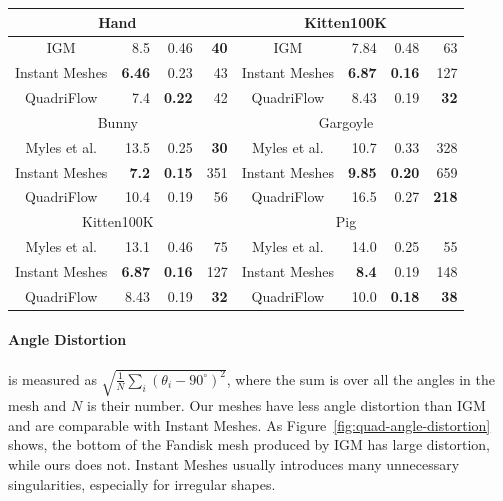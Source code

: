 \begin{table}
\begin{tabular}{|c|r|r|r|c|r|r|r|}
\hline
\multicolumn{4}{|c|}{Hand~\cite{bommes2013integer}}  & \multicolumn{4}{c|}{Kitten100K~\cite{bommes2013integer}}  \\
\hline
IGM & 8.5 & 0.46 & \textbf{40} & IGM & 7.84 & 0.48 & 63 \\
\hline
Instant Meshes & \textbf{6.46} & 0.23 & 43 & Instant Meshes & \textbf{6.87} & \textbf{0.16} & 127 \\
\hline
QuadriFlow & 7.4 & \textbf{0.22} & 42 & QuadriFlow & 8.43 & 0.19 & \textbf{32} \\
\hline
\multicolumn{4}{|c|}{Bunny~\cite{myles2014robust}} & \multicolumn{4}{c|}{Gargoyle~\cite{myles2014robust}}  \\
\hline
Myles et al. & 13.5 & 0.25 & \textbf{30} & Myles et al. & 10.7 & 0.33 & 328 \\
\hline
Instant Meshes & \textbf{7.2} & \textbf{0.15} & 351 & Instant Meshes & \textbf{9.85} & \textbf{0.20} & 659 \\
\hline
QuadriFlow & 10.4 & 0.19 & 56 & QuadriFlow & 16.5 & 0.27 & \textbf{218} \\
\hline
\multicolumn{4}{|c|}{Kitten100K~\cite{myles2014robust}}  & \multicolumn{4}{c|}{Pig~\cite{myles2014robust}}  \\
\hline
Myles et al. & 13.1 & 0.46 & 75 & Myles et al. & 14.0 & 0.25 & 55 \\
\hline
Instant Meshes & \textbf{6.87} & \textbf{0.16} & 127 & Instant Meshes & \textbf{8.4} & 0.19 & 148 \\
\hline
QuadriFlow & 8.43 & 0.19 & \textbf{32} & QuadriFlow & 10.0 & \textbf{0.18} & \textbf{38} \\
\hline
\end{tabular}
\end{table}

\paragraph*{Angle Distortion} is measured as $\sqrt{\frac{1}{N}\sum_{i}(\theta_i-90^\circ)^2}$, where the sum is over all the angles in the mesh and $N$ is their number. Our meshes have less angle distortion than IGM~\cite{bommes2013integer} and are comparable with Instant Meshes. As Figure~\ref{fig:quad-angle-distortion} shows, the bottom of the Fandisk mesh produced by IGM has large distortion, while ours does not. Instant Meshes usually introduces many unnecessary singularities, especially for irregular shapes.

